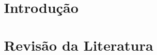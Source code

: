 \documentclass[
    12pt,               %
    openright,          %
    oneside,
    a4paper,            %
    MODELO,             %
    english,            %
    brazil,              %
    pstricks,border=12pt
   ]{ifsp-spo-inf-ctds}
\begin{document}
    \imprimircapa

    \frenchspacing 
    
    \pretextual
    
    \imprimirfolhaderosto
    
    
    
    
    
    
    
    \listoffigures*
    \cleardoublepage
    
    \listoftables*
    \cleardoublepage
    
    \listofquadros*
    \cleardoublepage
    

    \tableofcontents*
    \cleardoublepage
    
    \textual
    
    \chapter{Introdução}
    
    
    
    
    
    \chapter{Revisão da Literatura}
    
\end{document}
